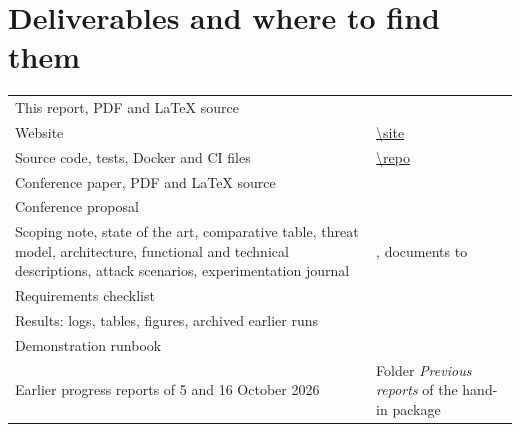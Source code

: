 \section{Deliverables and where to find them}
\label{app:deliverables}
\vspace{-0.45\baselineskip}{\color{cgrule}\rule{\textwidth}{0.6pt}}\par\vspace{0.15\baselineskip}
{\tablefont
\begin{tabularx}{\textwidth}{P{4.0cm}L}
\toprule
\headrow{} &  \\
\midrule
This report, PDF and LaTeX source &  \\
Website & \url{\site} \\
Source code, tests, Docker and CI files & \url{\repo} \\
Conference paper, PDF and LaTeX source &  \\
Conference proposal &  \\
Scoping note, state of the art, comparative table, threat model, architecture, functional and technical descriptions, attack scenarios, experimentation journal & , documents  to  \\
Requirements checklist &  \\
Results: logs, tables, figures, archived earlier runs &  \\
Demonstration runbook &  \\
Earlier progress reports of 5 and 16 October 2026 & Folder \emph{Previous reports} of the hand-in package \\
\bottomrule
\end{tabularx}}
